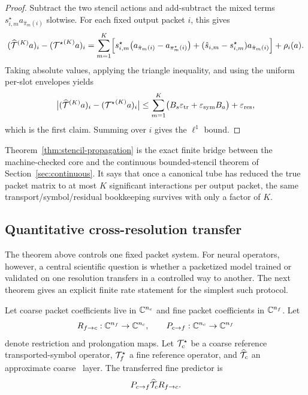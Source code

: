 \begin{proof}
Subtract the two stencil actions and add-subtract the mixed terms $s^\star_{i,m}a_{\hat\pi_m(i)}$ slotwise. For each fixed output packet $i$, this gives
\[
({\widehat{\mathcal T}}^{(K)}a)_i-({\mathcal T^\star}^{(K)}a)_i
=
\sum_{m=1}^{K}
\Bigl[
s^\star_{i,m}\bigl(a_{\hat\pi_m(i)}-a_{\pi_m^\star(i)}\bigr)
+
(\hat s_{i,m}-s^\star_{i,m})a_{\hat\pi_m(i)}
\Bigr]
+
\rho_i(a).
\]
Taking absolute values, applying the triangle inequality, and using the uniform per-slot envelopes yields
\[
\bigl|({\widehat{\mathcal T}}^{(K)}a)_i-({\mathcal T^\star}^{(K)}a)_i\bigr|
\le
\sum_{m=1}^{K}\bigl(B_s\varepsilon_{\mathrm{tr}}+\varepsilon_{\mathrm{sym}}B_a\bigr)+\varepsilon_{\mathrm{res}},
\]
which is the first claim. Summing over $i$ gives the $\ell^1$ bound.
\end{proof}

Theorem~\ref{thm:stencil-propagation} is the exact finite bridge between the machine-checked core and the continuous bounded-stencil theorem of Section~\ref{sec:continuous}. It says that once a canonical tube has reduced the true packet matrix to at most $K$ significant interactions per output packet, the same transport/symbol/residual bookkeeping survives with only a factor of $K$.

\subsection{Quantitative cross-resolution transfer}

The theorem above controls one fixed packet system. For neural operators, however, a central scientific question is whether a packetized model trained or validated on one resolution transfers in a controlled way to another. The next theorem gives an explicit finite rate statement for the simplest such protocol.

Let coarse packet coefficients live in $\mathbb C^{n_c}$ and fine packet coefficients in $\mathbb C^{n_f}$. Let
\[
R_{f\to c}:\mathbb C^{n_f}\to\mathbb C^{n_c},
\qquad
P_{c\to f}:\mathbb C^{n_c}\to\mathbb C^{n_f}
\]
denote restriction and prolongation maps. Let $\mathcal T^\star_c$ be a coarse reference transported-symbol operator, $\mathcal T^\star_f$ a fine reference operator, and $\widehat{\mathcal T}_c$ an approximate coarse \MiNO\ layer. The transferred fine predictor is
\[
P_{c\to f}\widehat{\mathcal T}_c R_{f\to c}.
\]

